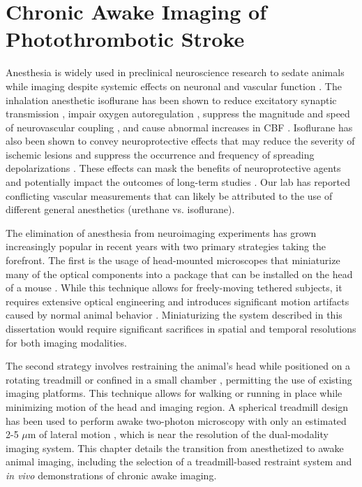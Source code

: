 
\chapter{Chronic Awake Imaging of Photothrombotic Stroke} \label{ch:awake}

Anesthesia is widely used in preclinical neuroscience research to sedate animals while imaging despite systemic effects on neuronal and vascular function \cite{Janssen:2004ih}. The inhalation anesthetic isoflurane has been shown to reduce excitatory synaptic transmission \cite{BergJohnsen:1992wk}, impair oxygen autoregulation \cite{Aksenov:2012wh}, suppress the magnitude and speed of neurovascular coupling \cite{Pisauro:2013cx}, and cause abnormal increases in CBF \cite{Strebel:1995uh, Iida:1998th}. Isoflurane has also been shown to convey neuroprotective effects that may reduce the severity of ischemic lesions \cite{Sakai:2007wc, Burchell:2013tj} and suppress the occurrence and frequency of spreading depolarizations \cite{Kudo:2016ho}. These effects can mask the benefits of neuroprotective agents and potentially impact the outcomes of long-term studies \cite{Kapinya:ua, Seto:2014ga}. Our lab has reported \cite{Ponticorvo:2010uv, Kazmi:2013ey, Sullender:2018ff} conflicting vascular  measurements that can likely be attributed to the use of different general anesthetics (urethane vs. isoflurane).

The elimination of anesthesia from neuroimaging experiments has grown increasingly popular in recent years with two primary strategies taking the forefront. The first is the usage of head-mounted microscopes that miniaturize many of the optical components into a package that can be installed on the head of a mouse \cite{Gu:1999ky, Helmchen:2001tw, Flusberg:2005tq}. While this technique allows for freely-moving tethered subjects, it requires extensive optical engineering and introduces significant motion artifacts caused by normal animal behavior \cite{Helmchen:2001tw}. Miniaturizing the system described in this dissertation would require significant sacrifices in spatial and temporal resolutions for both imaging modalities.

The second strategy involves restraining the animal's head while positioned on a rotating treadmill \cite{Pisauro:2013cx, Dombeck:2007gr, Wienisch:2011ju, Kaifosh:2013fy, Heiney:2018gq} or confined in a small chamber \cite{Silasi:2016dq}, permitting the use of existing imaging platforms. This technique allows for walking or running in place while minimizing motion of the head and imaging region. A spherical treadmill design has been used to perform awake two-photon microscopy with only an estimated 2-5 $\mu$m of lateral motion \cite{Dombeck:2007gr}, which is near the resolution of the dual-modality imaging system. This chapter details the transition from anesthetized to awake animal imaging, including the selection of a treadmill-based restraint system and \textit{in vivo} demonstrations of chronic awake imaging.



